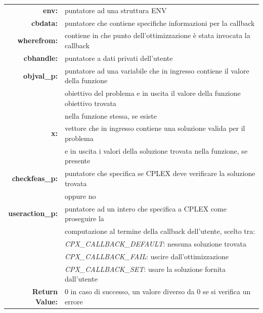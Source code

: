 \begin{table}[h]
\centering
\begin{tabular}{rl}
\textbf{env:} & {puntatore ad una struttura ENV}\\
\textbf{cbdata:} & {puntatore che contiene specifiche informazioni per la callback}\\
\textbf{wherefrom:} & {contiene in che punto dell'ottimizzazione è stata invocata la callback} \\ 
\textbf{cbhandle:} & {puntatore a dati privati dell'utente}\\
\textbf{objval\_p:} & {puntatore ad una variabile che in ingresso contiene il valore della funzione}\\
&{ obiettivo del problema e in uscita il valore della funzione obiettivo trovata}\\
&{nella funzione stessa, se esiste}\\
\textbf{x:} & {vettore che in ingresso contiene una soluzione valida per il problema }\\
&{e in uscita i valori della soluzione trovata nella funzione, se presente}\\
\textbf{checkfeas\_p:} & {puntatore che specifica se CPLEX deve verificare la soluzione trovata}\\
&{oppure no}\\
\textbf{useraction\_p:} & {puntatore ad un intero che specifica a CPLEX come proseguire la }\\
&{computazione al termine della callback dell'utente, scelto tra:}\\
&{\textit{CPX\_CALLBACK\_DEFAULT}: nessuna soluzione trovata}\\
&{\textit{CPX\_CALLBACK\_FAIL}: uscire dall'ottimizzazione}\\
&{\textit{CPX\_CALLBACK\_SET}: usare la soluzione fornita dall'utente}\\
\textbf{Return Value:} & {0 in caso di successo, un valore diverso da 0 se si verifica un errore}\\
\end{tabular}
\end{table}

